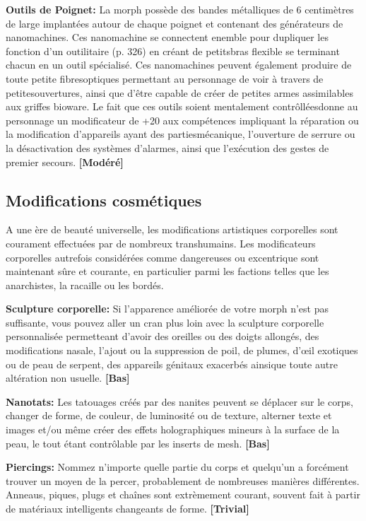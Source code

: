 \textbf{Outils de Poignet:} La morph possède des bandes métalliques de 6 centimètres de large implantées autour de chaque poignet et contenant des générateurs de nanomachines.  Ces nanomachine se connectent enemble pour dupliquer les fonction d'un outilitaire (p. 326) en créant de petitsbras flexible se terminant chacun en un outil spécialisé. Ces nanomachines peuvent également produire de toute petite fibresoptiques permettant au personnage de voir à travers de petitesouvertures, ainsi que d'être capable de créer de petites armes assimilables aux griffes bioware. Le fait que ces outils soient mentalement contrôlléesdonne au personnage un modificateur de +20 aux compétences impliquant la réparation ou la modification d'appareils ayant des partiesmécanique, l'ouverture de serrure ou la désactivation des systèmes d'alarmes, ainsi que l'exécution des gestes de premier secours. \textbf{[Modéré]} 

\subsection{Modifications cosmétiques} \label{sec:cosmetic-mods} 

A une ère de beauté universelle, les modifications artistiques corporelles sont courament effectuées par de nombreux transhumains. Les modificateurs corporelles autrefois considérées comme dangereuses ou excentrique sont maintenant sûre et courante, en particulier parmi les factions telles que les anarchistes, la racaille ou les bordés. 

\textbf{Sculpture corporelle:} Si l'apparence améliorée de votre morph n'est pas suffisante, vous pouvez aller un cran plus loin avec la sculpture corporelle personnalisée permetteant d'avoir des oreilles ou des doigts allongés, des modifications nasale, l'ajout ou la suppression de poil, de plumes, d'œil exotiques ou de peau de serpent, des appareils génitaux exacerbés ainsique toute autre altération non usuelle. \textbf{[Bas]} 

\textbf{Nanotats:} Les tatouages créés par des nanites peuvent se déplacer sur le corps, changer de forme, de couleur, de luminosité ou de texture, alterner texte et images et/ou même créer des effets holographiques mineurs à la surface de la peau, le tout étant contrôlable par les inserts de mesh. \textbf{[Bas]} 

\textbf{Piercings:} Nommez n'importe quelle partie du corps et quelqu'un a forcément trouver un moyen de la percer, probablement de nombreuses manières différentes. Anneaus, piques, plugs et chaînes sont extrèmement courant, souvent fait à partir de matériaux intelligents changeants de forme. \textbf{[Trivial]} 

